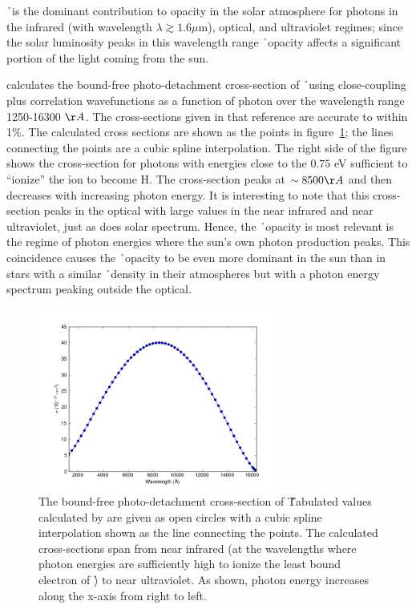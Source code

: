 \h\ is the dominant contribution to opacity in the solar atmosphere for photons in the infrared (with wavelength $\lambda \gtrsim 1.6 \mu$m), optical, and ultraviolet regimes; since the solar luminosity peaks in this wavelength range \h\ opacity affects a significant portion of the light coming from the sun.

\cite{wishart1979} calculates the bound-free photo-detachment
cross-section of \h\ using close-coupling plus correlation
wavefunctions as a function of photon
over the wavelength range 1250-16300 $\AA$.  The cross-sections given
in that reference are accurate to within 1\%.
The calculated cross sections are shown as the points in
figure~\ref{fig:bfcrosssection}; the lines connecting the points are a
cubic spline interpolation.  The right side of the figure shows the
cross-section for photons with energies close to the $0.75$ eV
sufficient to ``ionize'' the \h ion to become H.  The cross-section
peaks at $\sim 8500\AA$ and then decreases with increasing photon
energy.  It is interesting to note that this cross-section peaks in
the optical with large values in the near infrared and near
ultraviolet, just as does solar spectrum.  Hence, the \h\ opacity is
most relevant is the regime of photon energies where the sun's own
photon production peaks.  This coincidence causes the \h\ opacity to
be even more dominant in the sun than in stars with a similar \h\
density in their atmospheres but with a photon energy spectrum peaking
outside the optical.
\begin{figure}
\includegraphics[width=80mm]{figs/boundfree_crosssection.png}
\caption{\label{fig:bfcrosssection}The bound-free photo-detachment
cross-section of \h\. Tabulated values calculated
by \cite{wishart1979} are given as open circles with a cubic spline
interpolation shown as the line connecting the points.  The calculated
cross-sections span from near infrared (at the wavelengths where photon
energies are sufficiently high to ionize the least bound electron
of \h) to near ultraviolet. As shown, photon energy increases along
the x-axis from right to left.}
\end{figure}
